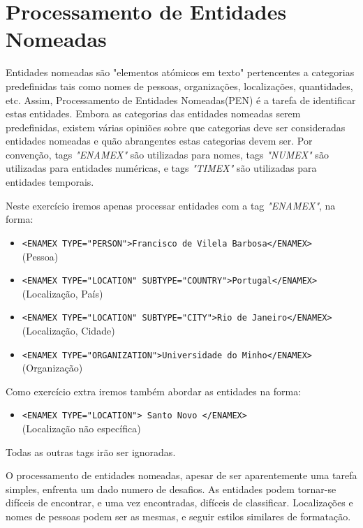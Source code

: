 \chapter{Processamento de Entidades Nomeadas}
\label{cap:enamex}

Entidades nomeadas são "elementos atómicos em texto" pertencentes a categorias predefinidas tais como nomes de pessoas, organizações, localizações, quantidades, etc. Assim, Processamento de Entidades Nomeadas(PEN) é a tarefa de identificar estas entidades.
Embora as categorias das entidades nomeadas serem predefinidas, existem várias opiniões sobre que categorias deve ser consideradas entidades nomeadas e quão abrangentes estas categorias devem ser. Por convenção, tags \emph{"ENAMEX"} são utilizadas para nomes, tags \emph{"NUMEX"} são utilizadas para entidades numéricas, e tags \emph{"TIMEX"} são utilizadas para entidades temporais.

Neste exercício iremos apenas processar entidades com a tag \emph{"ENAMEX"}, na forma:
\begin{itemize}
\item\verb!<ENAMEX TYPE="PERSON">Francisco de Vilela Barbosa</ENAMEX>!\\(Pessoa)
\item\verb!<ENAMEX TYPE="LOCATION" SUBTYPE="COUNTRY">Portugal</ENAMEX>!\\ (Localização, País)
\item\verb!<ENAMEX TYPE="LOCATION" SUBTYPE="CITY">Rio de Janeiro</ENAMEX>!\\  (Localização, Cidade)
\item\verb!<ENAMEX TYPE="ORGANIZATION">Universidade do Minho</ENAMEX>!\\(Organização)
\end{itemize}

Como exercício extra iremos também abordar as entidades na forma:
\begin{itemize}
\item\verb!<ENAMEX TYPE="LOCATION"> Santo Novo </ENAMEX>!\\(Localização não específica)
\end{itemize}
Todas as outras tags irão ser ignoradas.

O processamento de entidades nomeadas, apesar de ser aparentemente uma tarefa simples, enfrenta um dado numero de desafios. As entidades podem tornar-se difíceis de encontrar, e uma vez encontradas, difíceis de classificar. Localizações e nomes de pessoas podem ser as mesmas, e seguir estilos similares de formatação.

